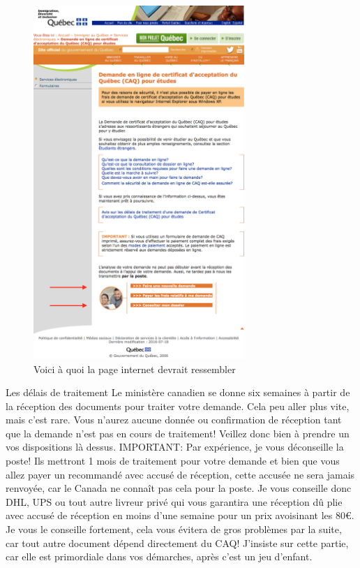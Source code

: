 \begin{figure}[h!]
\centering
\includegraphics[width = 80mm]{figures/Site_CAQ}
\caption{Voici à quoi la page internet devrait ressembler}
\end{figure}


\begin{example}{Les délais de traitement}
  Le ministère canadien se donne six semaines à partir de la réception des documents pour traiter votre demande. Cela peu aller plus vite, mais c’est rare. Vous n’aurez aucune donnée ou confirmation de réception tant que la demande n’est pas en cours de traitement! Veillez donc bien à prendre un vos dispositions là dessus.
  IMPORTANT: Par expérience, je vous déconseille la poste! Ils mettront 1 mois de traitement pour votre demande et bien que vous allez payer un recommandé avec accusé de réception, cette accusée ne sera jamais renvoyée, car le Canada ne connaît pas cela pour la poste.
  Je vous conseille donc DHL, UPS ou tout autre livreur privé qui vous garantira une réception dû plie avec accusé de réception en moins d’une semaine pour un prix avoisinant les 80\euro{}. Je vous le conseille fortement, cela vous évitera de gros problèmes par la suite, car tout autre document dépend directement du CAQ!
  J’insiste sur cette partie, car elle est primordiale dans vos démarches, après c’est un jeu d’enfant.
\end{example}

